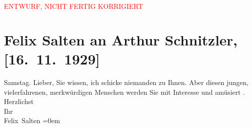 
\begin{center}
            \textcolor{red}{ENTWURF, NICHT FERTIG KORRIGIERT}
                      \end{center}
            
         
         \renewcommand{\erwaehntePersonen}{Personen: Boris Sapiro}
         \renewcommand{\erwaehnteOrte}{Orte: Wien}
         \renewcommand{\erwaehnteWerke}{}
               \section[Felix Salten an Arthur Schnitzler, {[}16. 11. 1929{]}]{ Felix Salten an Arthur Schnitzler, {[}16. 11. 1929{]}}\nopagebreak{}\rehead{ }\begin{ledgroupsized}[t]{13cm}\normalsize\beginnumbering \toendnotes[C]{\smallbreak\pagebreak[2]} 
\toendnotes[C]{\smallbreak}\pstart
           \raggedleft{}{\pb}Samstag. \pend
           \pstart
           Lieber, Sie wissen, ich schicke niemanden zu Ihnen. Aber diesen
               jungen, vielerfahrenen, merkwürdigen Menschen werden Sie mit Interesse und amüsiert \label{K_L03589-1v}\label{K_L03589-1h}.\pend
           \pstart
           Herzlichst {\\[\baselineskip]}Ihr {\\[\baselineskip]}\spacefill\mbox{Felix Salten}\pend
           \leftskip=0em{}
         
         \endnumbering{}\end{ledgroupsized}\begin{anhang}\end{anhang}\newcommand{\dateiname}{L03589}\newcommand{\titel}{Felix Salten an Arthur Schnitzler, [16. 11. 1929]}\newcommand{\editorInnen}{Martin Anton Müller und Laura Untner}
      